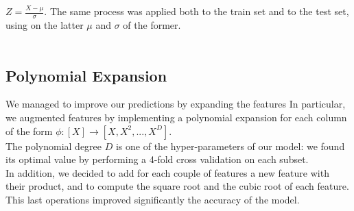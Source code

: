 \documentclass[10pt,conference,compsocconf]{IEEEtran}
\begin{document}
\begin{center}
\label{fig:accuracytab}
\\
\end{center}
\vspace{0.1cm}\\

$Z=\frac{X-\mu}{\sigma}$. The same process was applied both to the train set and to the test set, using on the latter $\mu$ and $\sigma$ of the former.\\
\vspace{-0.8cm}\\

\subsection{Polynomial Expansion}
We managed to improve our predictions by expanding the features In particular, we augmented features by implementing a polynomial expansion for each column of the form $\phi:[X]\rightarrow [X,X^2,...,X^D]$.\\
The polynomial degree $D$ is one of the hyper-parameters of our model: we found its optimal value by performing a 4-fold cross validation on each subset.\\
In addition, we decided to add for each couple of features a new feature with their product, and to compute the square root and the cubic root of each feature. This last operations improved significantly the accuracy of the model.\\
\vspace{-0.6cm}\\
\end{document}
